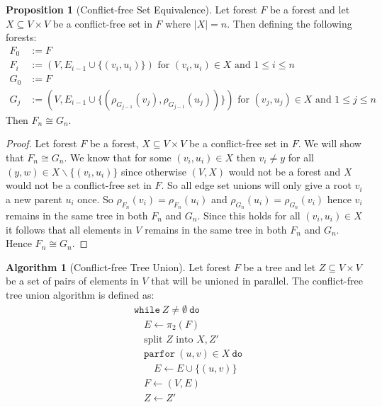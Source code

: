 \documentclass[a4paper,12pt]{article}
\theoremstyle{definition}
\newtheorem{proposition}{Proposition}[section]
\newtheorem{algorithm}{Algorithm}[section]
\newcommand{\kw}[1]{\ensuremath{\mathtt{#1}}}
\begin{document}
\begin{proposition}[Conflict-free Set Equivalence]\label{prop:conflict-free-set-equivalence}
    Let forest $F$ be a forest and let $X \subseteq V \times V$ be a
    conflict-free set in $F$ where $|X| = n$. Then defining the following forests:
    \begin{align*}
        F_0 &:= F \\
        F_{i} &:= (V, E_{i - 1} \cup \{(v_i, u_i)\}) \text{ for } (v_i, u_i) \in X \text{ and } 1 \leq i \leq n \\
        G_0 &:= F \\
        G_{j} &:= (V, E_{i - 1} \cup \{(\rho_{G_{j - 1}}(v_j), \rho_{G_{j - 1}}(u_j))\}) \text{ for } (v_j, u_j) \in X \text{ and } 1 \leq j \leq n
    \end{align*}
    Then $F_{n} \cong G_{n}$.
\end{proposition}
\begin{proof}
    Let forest $F$ be a forest, $X \subseteq V \times V$ be a conflict-free set
    in $F$. We will show that $F_n \cong G_n$. We know that for some $(v_i, u_i)
    \in X$ then $v_i \neq y$ for all  $(y, w) \in X \backslash \{(v_i, u_i)\}$
    since otherwise $(V, X)$ would not be a forest and $X$ would not be a
    conflict-free set in $F$. So all edge set unions will only give a root $v_i$
    a new parent $u_i$ once. So $\rho_{F_n}(v_i) = \rho_{F_n}(u_i)$ and
    $\rho_{G_n}(u_i) = \rho_{G_n}(v_i)$ hence $v_i$ remains in the same tree in
    both $F_n$ and $G_n$. Since this holds for all $(v_i, u_i) \in X$ it follows
    that all elements in $V$ remains in the same tree in both $F_n$ and $G_n$.
    Hence $F_n \cong G_n$.
\end{proof}

\begin{algorithm}[Conflict-free Tree Union]
    Let forest $F$ be a tree and let $Z \subseteq V \times V$ be a set of pairs
    of elements in $V$ that will be unioned in parallel. The conflict-free tree
    union algorithm is defined as:
    \begin{align*}
        & \kw{while} \: Z \neq \emptyset \: \kw{do} \\
        & \quad E \leftarrow \pi_2(F) \\
        & \quad \text{split } Z \text{ into } X, Z' \\
        & \quad \kw{parfor} \: (u, v) \in X \: \kw{do} \\
        & \quad \quad E \leftarrow E \cup \{(u, v)\} \\
        & \quad F \leftarrow (V, E) \\
        & \quad Z \leftarrow Z'
    \end{align*}
\end{algorithm}
\end{document}
